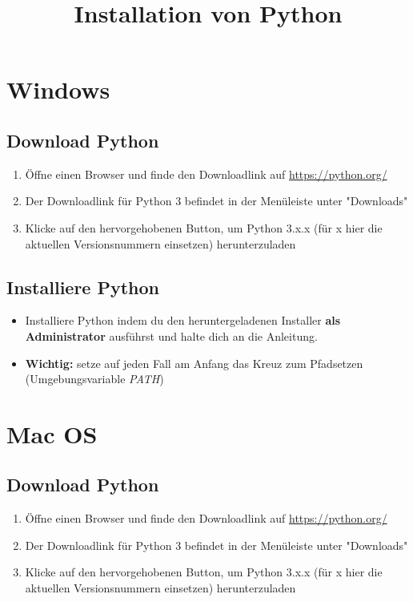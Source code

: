 \documentclass[accentcolor=3c,colorbacktitle,12pt]{tudaexercise}
\title{Installation von Python}
\begin{document}
\maketitle



\section*{Windows}
\subsection*{Download Python}
\begin{enumerate}
    \item Öffne einen Browser und finde den Downloadlink auf \url{https://python.org/}
    \item Der Downloadlink für Python 3 befindet in der Menüleiste unter "Downloads"
    \item Klicke auf den hervorgehobenen Button, um Python 3.x.x (für x hier die aktuellen Versionsnummern einsetzen) herunterzuladen
\end{enumerate}
\subsection*{Installiere Python}
\begin{itemize}
    \item Installiere Python indem du den heruntergeladenen Installer \textbf{als Administrator} ausführst und halte dich an die Anleitung.
    \item \textbf{Wichtig:} setze auf jeden Fall am Anfang das Kreuz zum Pfadsetzen (Umgebungsvariable \emph{PATH})
\end{itemize}

\section*{Mac OS}
\subsection*{Download Python}
\begin{enumerate}
    \item Öffne einen Browser und finde den Downloadlink auf \url{https://python.org/}
    \item Der Downloadlink für Python 3 befindet in der Menüleiste unter "Downloads"
    \item Klicke auf den hervorgehobenen Button, um Python 3.x.x (für x hier die aktuellen Versionsnummern einsetzen) herunterzuladen
\end{enumerate}
\end{document}

